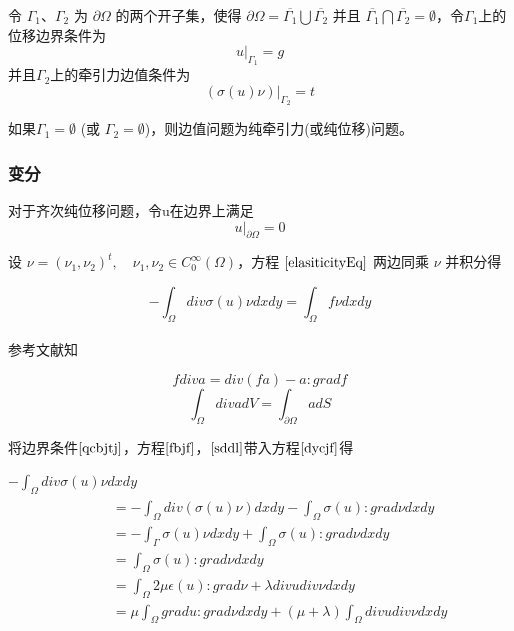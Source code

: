 \documentclass[a4paper,UTF8,titlepage]{ctexart}
\begin{document}
令 $\Gamma_1$、$\Gamma_2$ 为 $\partial \Omega$ 的两个开子集，使得 $\partial \Omega = \overline{\Gamma_1} \bigcup \overline{\Gamma_2}$ 并且 $\overline{\Gamma_1} \bigcap \overline{\Gamma_2} = \emptyset$，令$\Gamma_1$上的位移边界条件为
\begin{equation}
	u|_{\Gamma_1} = g
\end{equation}
并且$\Gamma_2$上的牵引力边值条件为
\begin{equation}
	(\sigma(u) \nu) |_{\Gamma_2} = t
\end{equation}

如果$\Gamma_1 = \emptyset$ (或 $\Gamma_2 = \emptyset$)，则边值问题为纯牵引力(或纯位移)问题。

\subsubsection{变分}

对于齐次纯位移问题，令u在边界上满足
\begin{equation}
u |_{\partial \Omega} = 0
\label{qcbjtj}
\end{equation}

设 $\nu = (\nu_1,\nu_2)^t, \quad \nu_1, \nu_2 \in C_0^{\infty}(\Omega)$，方程 $\eqref{elasiticityEq}$ 两边同乘 $\nu$ 并积分得

\begin{equation}
-\int_{\Omega} div \sigma(u) \nu dxdy = \int_{\Omega} f \nu dxdy
\label{dycjf}
\end{equation}

参考文献知\textsuperscript{\cite{陈纪修2004数学分析}}

\begin{equation}
	f div a = div(fa) - a : grad f 
\label{fbjf}
\end{equation}
\begin{equation}
	\int_{\Omega} div a dV = \int_{\partial \Omega} a dS
\label{sddl}
\end{equation}

将边界条件$\eqref{qcbjtj}$，方程$\eqref{fbjf}$，$\eqref{sddl}$带入方程$\eqref{dycjf}$得

\par \quad \quad
$-\int_{\Omega} div \sigma(u) \nu dxdy$
$$ 
\quad \quad
\begin{matrix}
	\begin{aligned}
		&= -\int_{\Omega} div(\sigma(u) \nu) dxdy - \int_{\Omega} \sigma(u) : grad \nu dxdy \\
		&= -\int_{\Gamma} \sigma(u) \nu dxdy + \int_{\Omega} \sigma(u) : grad \nu dxdy \\
		&= \int_{\Omega} \sigma(u) : grad \nu dxdy \\
		&= \int_{\Omega} 2 \mu \epsilon(u) : grad \nu + \lambda div u div \nu dxdy  \\
		&= \mu \int_{\Omega} grad u : grad \nu dxdy + (\mu +\lambda) \int_{\Omega} div u div \nu  dxdy
	\end{aligned}
\end{matrix}
$$
\end{document}
